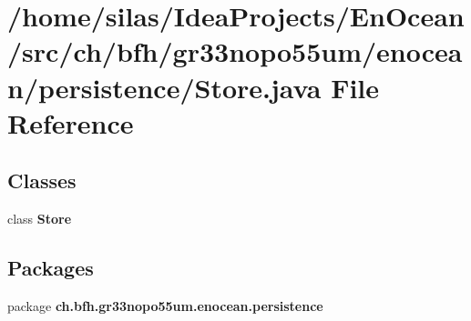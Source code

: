 \section{/home/silas/\+Idea\+Projects/\+En\+Ocean/src/ch/bfh/gr33nopo55um/enocean/persistence/\+Store.java File Reference}
\label{Store_8java}
\subsection*{Classes}
\begin{DoxyCompactItemize}
\item 
class {\bf Store}
\end{DoxyCompactItemize}
\subsection*{Packages}
\begin{DoxyCompactItemize}
\item 
package {\bf ch.\+bfh.\+gr33nopo55um.\+enocean.\+persistence}
\end{DoxyCompactItemize}
